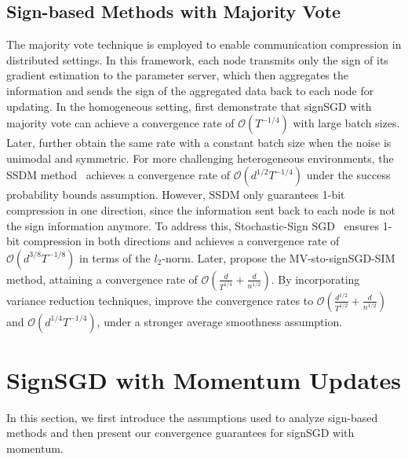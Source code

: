\documentclass{article}
\begin{document}
\subsection{Sign-based Methods with Majority Vote}
The majority vote technique is employed to enable communication compression in distributed settings. In this framework, each node transmits only the sign of its gradient estimation to the parameter server, which then aggregates the information and sends the sign of the aggregated data back to each node for updating. 
In the homogeneous setting, \cite{pmlr-v80-bernstein18a} first demonstrate that signSGD with majority vote can achieve a convergence rate of $\mathcal{O}(T^{-1/4})$ with large batch sizes. Later, \cite{bernstein2018signsgd} further obtain the same rate with a constant batch size when the noise is unimodal and symmetric. 
For more challenging heterogeneous environments, the SSDM method~\citep{pmlr-v139-safaryan21a} achieves a convergence rate of $\mathcal{O}(d^{1/2} T^{-1/4})$ under the success probability bounds assumption. However, SSDM only guarantees 1-bit compression in one direction, since the information sent back to each node is not the sign information anymore. 
To address this, Stochastic-Sign SGD~\citep{Jin2020StochasticSignSF} ensures 1-bit compression in both directions and achieves a convergence rate of $\mathcal{O}(d^{3/8} T^{-1/8})$ in terms of the $l_2$-norm. Later, \cite{pmlr-v202-sun23l} propose the MV-sto-signSGD-SIM method, attaining a convergence rate of $\mathcal{O}\left( \frac{d}{T^{1/4}} + \frac{d}{n^{1/2}} \right)$. 
By incorporating variance reduction techniques, \cite{NeurIPS:2024:Jiang:B} improve the convergence rates to $\mathcal{O}\left( \frac{d^{1/2}}{T^{1/2}} + \frac{d}{n^{1/2}} \right)$ and $\mathcal{O}(d^{1/4} T^{-1/4})$, under a stronger average smoothness assumption.


\section{SignSGD with Momentum Updates}
In this section, we first introduce the assumptions used to analyze sign-based methods and then present our convergence guarantees for signSGD with momentum.
\end{document}
